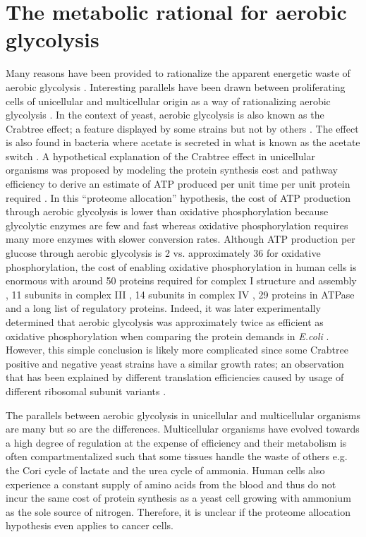 \section{The metabolic rational for aerobic glycolysis}
Many reasons have been provided to rationalize the apparent energetic waste of aerobic glycolysis \cite{Vander_Heiden2009-uf, OBrien2013-dt, Huberts2012-gk, Zhuang2011-nm, Pfeiffer2001-pu}.
Interesting parallels have been drawn between proliferating cells of unicellular and multicellular origin as a way of rationalizing aerobic glycolysis \cite{Vander_Heiden2009-uf}.
In the context of yeast, aerobic glycolysis is also known as the Crabtree effect; a feature displayed by some strains but not by others \cite{De_Deken1966-bp}.
The effect is also found in bacteria where acetate is secreted in what is known as the acetate switch \cite{Wolfe2005-cy}.
A hypothetical explanation of the Crabtree effect in unicellular organisms was proposed by modeling the protein synthesis cost and pathway efficiency to derive an estimate of ATP produced per unit time per unit protein required \cite{Molenaar2009-go}.
In this ``proteome allocation'' hypothesis, the cost of ATP production through aerobic glycolysis is lower than oxidative phosphorylation because glycolytic enzymes are few and fast whereas oxidative phosphorylation requires many more enzymes with slower conversion rates.
Although ATP production per glucose through aerobic glycolysis is 2 vs. approximately 36 for oxidative phosphorylation, the cost of enabling oxidative phosphorylation in human cells is enormous with around 50 proteins required for complex I structure and assembly \cite{Sharma2009-ws}, 11 subunits in complex III \cite{Iwata1998-td}, 14 subunits in complex IV \cite{Signes2018-df}, 29 proteins in ATPase \cite{He2018-rl} and a long list of regulatory proteins.
Indeed, it was later experimentally determined that aerobic glycolysis was approximately twice as efficient as oxidative phosphorylation when comparing the protein demands in \textit{E.coli} \cite{Basan2015-bq}.
However, this simple conclusion is likely more complicated since some Crabtree positive and negative yeast strains have a similar growth rates; an observation that has been explained by different translation efficiencies caused by usage of different ribosomal subunit variants \cite{Malina2021-lb}.

The parallels between aerobic glycolysis in unicellular and multicellular organisms are many but so are the differences.
Multicellular organisms have evolved towards a high degree of regulation at the expense of efficiency and their metabolism is often compartmentalized such that some tissues handle the waste of others e.g. the Cori cycle of lactate and the urea cycle of ammonia.
Human cells also experience a constant supply of amino acids from the blood and thus do not incur the same cost of protein synthesis as a yeast cell growing with ammonium as the sole source of nitrogen.
Therefore, it is unclear if the proteome allocation hypothesis even applies to cancer cells.

